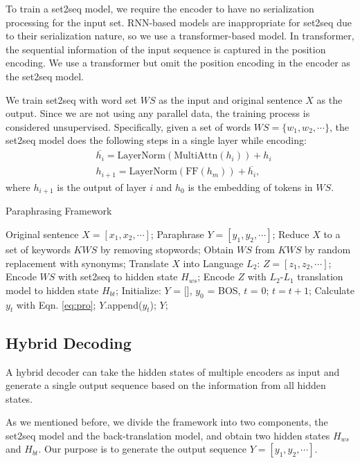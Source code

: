 To train a set2seq model, we require the encoder to have no serialization processing for the input set. RNN-based models are inappropriate for set2seq due to their serialization nature, so we use a transformer-based model. In transformer, the sequential information of the input sequence is captured in the position encoding. We use a transformer but omit the position encoding in the encoder as the set2seq model.

We train set2seq with word set $WS$ as the input and original sentence 
$X$ as the output. Since we are not using any parallel data, the training process is considered unsupervised.  Specifically, given a set of words $WS = \{w_1, w_2,\cdots\}$, the set2seq model does the following steps in a single layer while encoding:
\begin{align}
& \overline{h_{i}} = \text{LayerNorm}(\text{MultiAttn}(h_{i})) + h_{i} \\
& h_{i+1} = \text{LayerNorm}(\text{FF}(h_{m})) + \overline{h_{i}},
\end{align}
where $h_{i+1}$ is the output of layer $i$ and $h_0$ is the embedding of tokens in $WS$.

\begin{algorithm}[t]
\caption{Paraphrasing Framework} 
\label{alg:jd}
\begin{algorithmic}[1]
\REQUIRE Original sentence $X = [x_1, x_2, \cdots]$;
\ENSURE Paraphrase $Y = [y_1, y_2, \cdots]$;
\STATE Reduce $X$ to a set of keywords $KWS$ by removing stopwords;
\STATE Obtain $WS$ from $KWS$ by random replacement with synonyms;
\STATE Translate $X$ into Language $L_2$: $Z = [z_1,z_2,\cdots]$;
\STATE Encode $WS$ with set2seq to hidden state $H_{ws}$;
\STATE Encode $Z$ with $L_2$-$L_1$ translation model to hidden state $H_{bt}$;
\STATE Initialize: $Y$ = [], $y_0$ = BOS, $t$ = 0;
\STATE $t = t + 1$;
\STATE Calculate $y_t$ with Eqn. \ref{eq:pro};
\STATE $Y$.append($y_t$);
\ENDWHILE
\RETURN $Y$;
\end{algorithmic}
\end{algorithm}


\subsection{Hybrid Decoding}\label{sec:joint}
A hybrid decoder can take the hidden states of multiple encoders as input and generate a single output sequence based on the information from all hidden states.

As we mentioned before, we divide the framework into two components, the set2seq model and the back-translation model, and obtain two hidden states $H_{ws}$ and $H_{bt}$. Our purpose is to generate the output sequence $Y = [y_1, y_2, \cdots]$.

